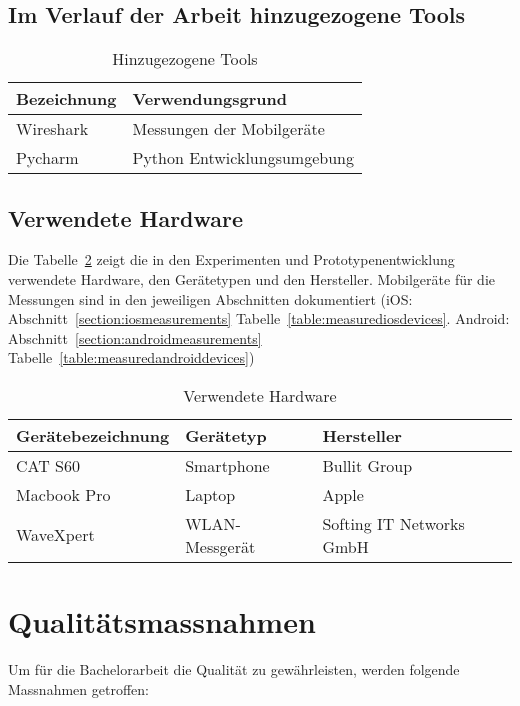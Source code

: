 \subsection*{Im Verlauf der Arbeit hinzugezogene Tools}
\begin{table}[H]
	\centering
	\begin{tabularx}{\linewidth}{l X}
		\toprule 
		\textbf{Bezeichnung} & \textbf{Verwendungsgrund} \\
		\midrule
		Wireshark & Messungen der Mobilgeräte \\
		\midrule
		Pycharm & Python Entwicklungsumgebung \\
		\bottomrule 
	\end{tabularx} 
	\caption{Hinzugezogene Tools
	\label{table:HinzugezogeneTools}} 
\end{table}

\clearpage 

\subsection*{Verwendete Hardware}
Die Tabelle~\ref{table:VerwendeteHardware} zeigt die in den Experimenten und
Prototypenentwicklung verwendete Hardware, den Gerätetypen und
den Hersteller. Mobilgeräte für die Messungen sind in den jeweiligen Abschnitten 
dokumentiert (iOS: Abschnitt~\ref{section:iosmeasurements} 
Tabelle~\ref{table:measurediosdevices}. 
Android: Abschnitt~\ref{section:androidmeasurements} 
Tabelle~\ref{table:measuredandroiddevices})
\begin{table}[H]
	\centering
	\begin{tabularx}{\linewidth}{l l l}
		\toprule 
		\textbf{Gerätebezeichnung} & \textbf{Gerätetyp} & \textbf{Hersteller} \\
		\midrule
		CAT S60 & Smartphone & Bullit Group \\
		\midrule 
		Macbook Pro & Laptop & Apple \\
		\midrule 
		WaveXpert & WLAN-Messgerät & Softing IT Networks GmbH  \\
		\bottomrule 
	\end{tabularx} 
	\caption{Verwendete Hardware
	\label{table:VerwendeteHardware}} 
\end{table}

\clearpage

\section{Qualitätsmassnahmen
\label{Qualitätsmassnahmen}}
Um für die Bachelorarbeit die Qualität zu gewährleisten, 
werden folgende Massnahmen getroffen:

